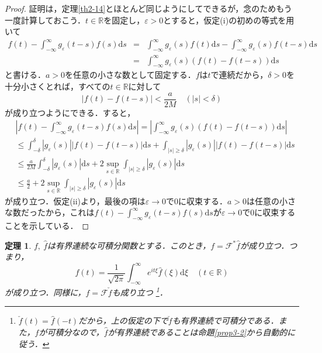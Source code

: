 \documentclass[a4j]{jsbook}
\newtheorem{theorem}{定理}
\numberwithin{theorem}{chapter}  %
\begin{document}
\begin{proof}
証明は，定理\ref{th2-14}とほとんど同じようにしてできるが，念のためもう一度計算しておこう．\(t\in\mathbb{R}\)を固定し，\(\varepsilon>0\)とすると，仮定(i)の初めの等式を用いて
\begin{eqnarray*}
f(t)-\int_{-\infty}^\infty g_\varepsilon(t-s)f(s)\mathrm{d}s&=&\int_{-\infty}^\infty g_\varepsilon(s)f(t)\mathrm{d}s-\int_{-\infty}^\infty g_\varepsilon(s)f(t-s)\mathrm{d}s \\
&=&\int_{-\infty}^\infty g_\varepsilon(s)(f(t)-f(t-s))\mathrm{d}s
\end{eqnarray*}
と書ける．\(a>0\)を任意の小さな数として固定する．\(f\)は\(t\)で連続だから，\(\delta>0\)を十分小さくとれば，すべての\(t\in\mathbb{R}\)に対して
\begin{equation*}
    |f(t)-f(t-s)|<\frac{a}{2M}\quad(|s|<\delta)
\end{equation*}
が成り立つようにできる．すると，
\begin{align*}
    &\left|f(t)-\int_{-\infty}^\infty g_\varepsilon(t-s)f(s)\mathrm{d}s\right|=\left|\int_{-\infty}^\infty g_\varepsilon(s)(f(t)-f(t-s))\mathrm{d}s\right| \\
    &\leq\int_{-\delta}^\delta |g_\varepsilon(s)||f(t)-f(t-s)|\mathrm{d}s+\int_{|s|\geq\delta}|g_\varepsilon(s)||f(t)-f(t-s)|\mathrm{d}s \\
    &\leq\frac{a}{2M}\int_{-\delta}^\delta |g_\varepsilon(s)|\mathrm{d}s+2\sup_{s\in\mathbb{R}}\int_{|s|\geq\delta}|g_\varepsilon(s)|\mathrm{d}s \\
    &\leq\frac{a}{2}+2\sup_{s\in\mathbb{R}}\int_{|s|\geq\delta}|g_\varepsilon(s)|\mathrm{d}s
\end{align*}
が成り立つ．仮定(ii)より，最後の項は\(\varepsilon\to 0\)で0に収束する．\(a>0\)は任意の小さな数だったから，これは\(\displaystyle f(t)-\int_{-\infty}^\infty g_\varepsilon(t-s)f(s)\mathrm{d}s\)が\(\varepsilon\to 0\)で0に収束することを示している．
\end{proof}
\begin{theorem} 
\label{th3-5}
\(f,\ \hat{f}\)は有界連続な可積分関数とする．このとき，\(f=\mathcal{F}^*\hat{f}\)が成り立つ．つまり，
\begin{equation*}
    f(t)=\frac{1}{\sqrt{2\pi}}\int_{-\infty}^\infty e^{it\xi}\hat{f}(\xi)\mathrm{d}\xi\quad(t\in\mathbb{R})
\end{equation*}
が成り立つ．同様に，\(f=\mathcal{F}\check{f}\)も成り立つ
\footnote{\(\check{f}(t)=\hat{f}(-t)\)だから，上の仮定の下で\(\check{f}\)も有界連続で可積分である．また，\(f\)が可積分なので，\(\hat{f}\)が有界連続であることは命題\ref{prop3-2}から自動的に従う．
}．
\end{theorem}
\end{document}
